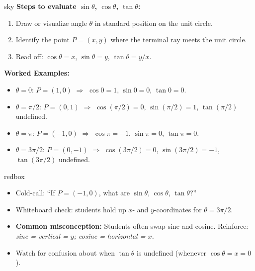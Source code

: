 \documentclass[10pt]{article}
\begin{document}
\vspace{6pt}

\begin{skillbox}{sky}
  \textbf{Steps to evaluate $\sin\theta$, $\cos\theta$, $\tan\theta$:}
  \begin{enumerate}[leftmargin=1.6em, itemsep=2pt]
    \item Draw or visualize angle $\theta$ in standard position on the unit circle.
    \item Identify the point $P = (x, y)$ where the terminal ray meets the unit circle.
    \item Read off: $\cos\theta = x$, \quad $\sin\theta = y$, \quad $\tan\theta = y/x$.
  \end{enumerate}

  \medskip
  \textbf{Worked Examples:}
  \begin{itemize}[leftmargin=1.4em, itemsep=3pt]
    \item $\theta = 0$: $P = (1, 0)$ $\Rightarrow$ $\cos 0 = 1$, $\sin 0 = 0$, $\tan 0 = 0$.
    \item $\theta = \pi/2$: $P = (0, 1)$ $\Rightarrow$ $\cos(\pi/2) = 0$, $\sin(\pi/2) = 1$,
          $\tan(\pi/2)$ undefined.
    \item $\theta = \pi$: $P = (-1, 0)$ $\Rightarrow$ $\cos\pi = -1$, $\sin\pi = 0$, $\tan\pi = 0$.
    \item $\theta = 3\pi/2$: $P = (0, -1)$ $\Rightarrow$ $\cos(3\pi/2) = 0$,
          $\sin(3\pi/2) = -1$, $\tan(3\pi/2)$ undefined.
  \end{itemize}
\end{skillbox}

\vspace{6pt}

\begin{skillbox}{redbox}
  \begin{itemize}[leftmargin=1.4em, itemsep=2pt]
    \item Cold-call: ``If $P = (-1,0)$, what are $\sin\theta$, $\cos\theta$, $\tan\theta$?''
    \item Whiteboard check: students hold up $x$- and $y$-coordinates for $\theta = 3\pi/2$.
    \item \textbf{Common misconception:} Students often swap sine and cosine. Reinforce:
          \textit{sine = vertical = $y$; cosine = horizontal = $x$.}
    \item Watch for confusion about when $\tan\theta$ is undefined (whenever $\cos\theta = x = 0$).
  \end{itemize}
\end{skillbox}
\end{document}
